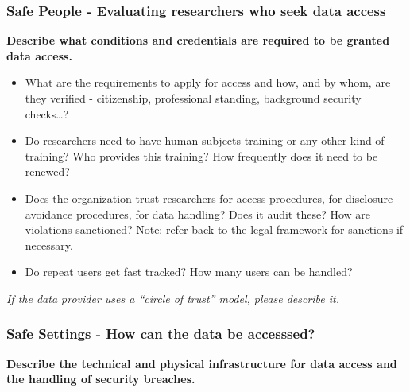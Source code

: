 \documentclass[
]{book}
\providecommand{\tightlist}{%
  \setlength{\itemsep}{0pt}\setlength{\parskip}{0pt}}
\begin{document}
\hypertarget{safe-people---evaluating-researchers-who-seek-data-access}{%
\subsubsection*{Safe People - Evaluating researchers who seek data access}\label{safe-people---evaluating-researchers-who-seek-data-access}}

\textbf{Describe what conditions and credentials are required to be granted data access.}

\begin{itemize}
\tightlist
\item
  What are the requirements to apply for access and how, and by whom, are they verified - citizenship, professional standing, background security checks\ldots?
\item
  Do researchers need to have human subjects training or any other kind of training? Who provides this training? How frequently does it need to be renewed?
\item
  Does the organization trust researchers for access procedures, for disclosure avoidance procedures, for data handling? Does it audit these? How are violations sanctioned? Note: refer back to the legal framework for sanctions if necessary.
\item
  Do repeat users get fast tracked? How many users can be handled?
\end{itemize}

\emph{If the data provider uses a ``circle of trust'' model, please describe it.}

\hypertarget{safe-settings---how-can-the-data-be-accesssed}{%
\subsubsection*{Safe Settings - How can the data be accesssed?}\label{safe-settings---how-can-the-data-be-accesssed}}

\textbf{Describe the technical and physical infrastructure for data access and the handling of security breaches.}
\end{document}
